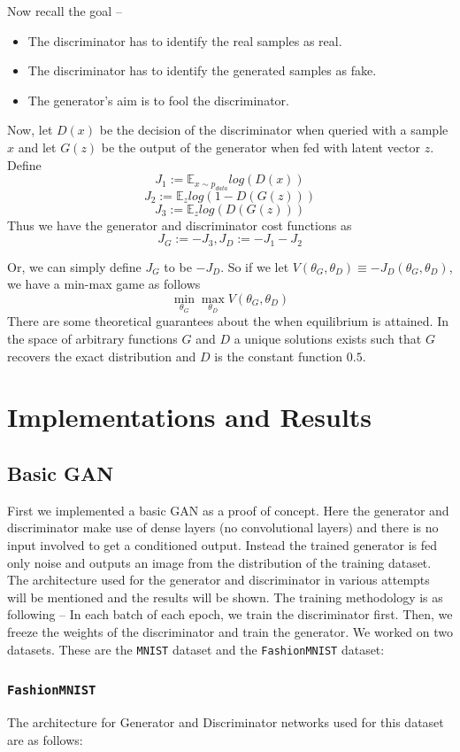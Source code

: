 \documentclass[conference]{IEEEtran}
\begin{document}
Now recall the goal -- 
\begin{itemize}
    \item The discriminator has to identify the real samples as real.
    \item The discriminator has to identify the generated samples as fake.
    \item The generator's aim is to fool the discriminator.
\end{itemize}
Now, let $D(x)$ be the decision of the discriminator when queried with a sample $x$ and let $G(z)$ be the output of the generator when fed with latent vector $z$. Define
     \[J_1 := \mathbb{E}_{x \sim p_{data}}log(D(x))\]
     \[J_2 := \mathbb{E}_zlog(1 - D(G(z)))\]
     \[J_3 := \mathbb{E}_zlog(D(G(z)))\]
Thus we have the generator and discriminator cost functions as
\[J_G := -J_3, J_D := -J_1 - J_2\]

Or, we can simply define $J_G$ to be $-J_D$. So if we let $V(\theta_G,\theta_D) \equiv -J_D(\theta_G,\theta_D)$, we have a min-max game as follows
 \[\min_{\theta_G}\max_{\theta_D}V(\theta_G,\theta_D)\]
There are some theoretical guarantees about the when equilibrium is attained.  In the space of arbitrary functions $G$ and $D$ a unique solutions exists such that $G$ recovers the exact distribution and $D$ is the constant function $0.5$.\newpage 


\section{Implementations and Results}

\subsection{Basic GAN}\label{AA}
First we implemented a basic GAN as a proof of concept. Here the generator and discriminator make use of dense layers (no convolutional layers) and there is no input involved to get a conditioned output. Instead the trained generator is fed only noise and outputs an image from the distribution of the training dataset. The architecture used for the generator and discriminator in various attempts will be mentioned and the results will be shown. The training methodology is as following -- In each batch of each epoch, we train the discriminator first. Then, we freeze the weights of the discriminator and train the generator.
We worked on two datasets. These are the \texttt{MNIST} dataset and the \texttt{FashionMNIST} dataset:
\subsubsection{\texttt{FashionMNIST}}
The architecture for Generator and Discriminator networks used for this dataset are as follows:
\end{document}
